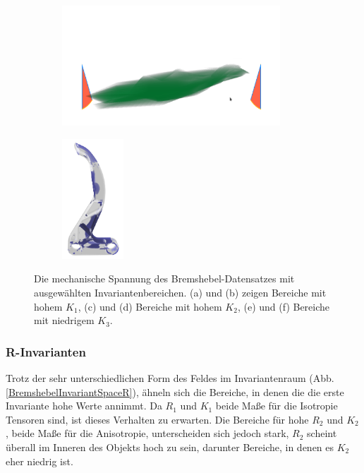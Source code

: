 \documentclass[a4paper,fontsize=12pt,toc=bib,halfparskip]{scrartcl}
\begin{document}
\begin{figure}[p]
\begin{subfigure}{0.49\textwidth}
		\subcaption{}
		\label{BremshebelKObject2}
	\end{subfigure}
	\medskip
	\begin{subfigure}{0.49\textwidth}
		\centering
		\includegraphics[height=4.5cm]{pictures/results/Bremshebel_K_InvariantSpace3.png}
		\subcaption{}
		\label{BremshebelKInvariant3}
	\end{subfigure}
	\hspace*{\fill}
	\begin{subfigure}{0.49\textwidth}
		\centering
		\includegraphics[height=4.5cm]{pictures/results/Bremshebel_K_Object3.png}
		\subcaption{}
		\label{BremshebelKObject3}
	\end{subfigure}
	\caption{Die mechanische Spannung des Bremshebel-Datensatzes mit ausgew\"ahlten Invariantenbereichen. (a) und (b) zeigen Bereiche mit hohem $K_1$, (c) und (d) Bereiche mit hohem $K_2$, (e) und (f) Bereiche mit niedrigem $K_3$.}
	\label{BremshebelKInteraction}
\end{figure}

\subsubsection{R-Invarianten}
Trotz der sehr unterschiedlichen Form des Feldes im Invariantenraum (Abb. \ref{BremshebelInvariantSpaceR}), \"ahneln sich die Bereiche, in denen die die erste Invariante hohe Werte annimmt. Da $R_1$ und $K_1$ beide Ma{\ss}e f\"ur die Isotropie Tensoren sind, ist dieses Verhalten zu erwarten. Die Bereiche f\"ur hohe $R_2$ und $K_2$, beide Ma{\ss}e f\"ur die Anisotropie, unterscheiden sich jedoch stark, $R_2$ scheint \"uberall im Inneren des Objekts hoch zu sein, darunter Bereiche, in denen es $K_2$ eher niedrig ist. 
\end{document}
